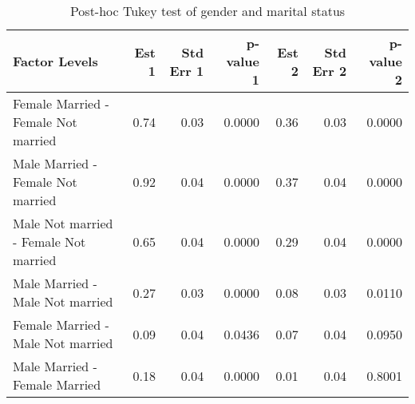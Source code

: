 \documentclass[11pt]{extarticle} %
\begin{document}
\begin{table}[H]
\footnotesize
\centering
\begin{tabular}{lrrrrrr}
  \hline
Factor Levels & Est 1 & Std Err 1 & p-value 1 & Est 2 & Std Err 2 & p-value 2 \\ 
  \hline
  Female Married -  Female Not married & 0.74 & 0.03 & 0.0000 & 0.36 & 0.03 & 0.0000 \\ 
    Male Married -  Female Not married & 0.92 & 0.04 & 0.0000 & 0.37 & 0.04 & 0.0000 \\ 
    Male Not married -  Female Not married & 0.65 & 0.04 & 0.0000 & 0.29 & 0.04 & 0.0000 \\ 
    Male Married -  Male Not married & 0.27 & 0.03 & 0.0000 & 0.08 & 0.03 & 0.0110 \\ 
    Female Married -  Male Not married & 0.09 & 0.04 & 0.0436 & 0.07 & 0.04 & 0.0950 \\ 
    Male Married -  Female Married & 0.18 & 0.04 & 0.0000 & 0.01 & 0.04 & 0.8001 \\ 
   \hline
\end{tabular}
\caption{Post-hoc Tukey test of gender and marital status} 
\label{tab:Table6GenderMS}
\end{table}
\end{document}
